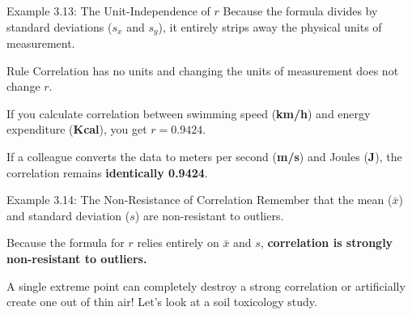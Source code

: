 \documentclass[aspectratio=169]{beamer}
\begin{document}
\begin{frame}{Example 3.13: The Unit-Independence of $r$}
Because the formula divides by standard deviations ($s_x$ and $s_y$), it entirely strips away the physical units of measurement. 
\vspace{0.3cm}
\begin{alertblock}{Rule}
Correlation has no units and changing the units of measurement does not change $r$.
\end{alertblock}
\vspace{0.3cm}
  
If you calculate correlation between swimming speed (\textbf{km/h}) and energy expenditure (\textbf{Kcal}), you get $r = 0.9424$. 
  
If a colleague converts the data to meters per second (\textbf{m/s}) and Joules (\textbf{J}), the correlation remains \textbf{identically 0.9424}. 
\end{frame}

\begin{frame}{Example 3.14: The Non-Resistance of Correlation}
Remember that the mean ($\bar{x}$) and standard deviation ($s$) are non-resistant to outliers. 

\vspace{0.3cm}

Because the formula for $r$ relies entirely on $\bar{x}$ and $s$, \textbf{correlation is strongly non-resistant to outliers.} 

\vspace{0.3cm}

A single extreme point can completely destroy a strong correlation or artificially create one out of thin air! Let's look at a soil toxicology study.
\end{frame}
\end{document}
